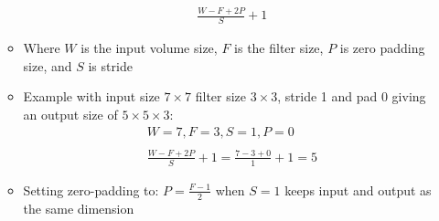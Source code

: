 \documentclass[12pt]{article}
\begin{document}
\begin{itemize}
\begin{itemize}
\begin{gather*}
            \frac{W - F + 2P}{S} + 1
        \end{gather*}
        \item Where $W$ is the input volume size, $F$ is the filter size, $P$ is zero padding size, and $S$ is stride
        \item Example with input size $7\times7$ filter size $3\times3$, stride 1 and pad 0 giving an output size of $5\times5\times3$:
        \begin{gather*}
            W = 7, F = 3, S = 1, P = 0 \\ \\
            \frac{W - F + 2P}{S} + 1 = \frac{7 - 3 + 0}{1} + 1 = 5
        \end{gather*}
        \item Setting zero-padding to: $P = \frac{F-1}{2}$ when $S = 1$ keeps input and output as the same dimension
    \end{itemize}
  \end{itemize}
\end{document}
